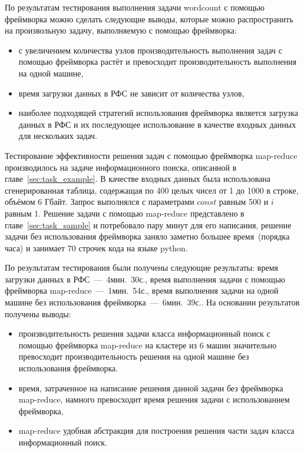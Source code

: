 \documentclass[12pt,a4paper,oneside]{extarticle}
\begin{document}
    По результатам тестирования выполнения задачи wordcount с помощью фреймворка можно сделать следующие выводы, которые можно распространить на произвольную задачу, выполняемую с помощью фреймворка:
    \begin{itemize}
        \item с увеличением количества узлов производительность выполнения задач с помощью фреймворка растёт и превосходит производительность выполнения на одной машине,
        \item время загрузки данных в РФС не зависит от количества узлов,
        \item наиболее подходящей стратегий использования фреймворка является загрузка данных в РФС и их последующее использование в качестве входных данных для нескольких задач.
    \end{itemize}
    
    Тестирование эффективности решения задач с помощью фреймворка map-reduce производилось на задаче информационного поиска, описанной в главе~\ref{sec:task_example}. В качестве входных данных была использована сгенерированная таблица, содержащая по 400 целых чисел от 1 до 1000 в строке, объёмом 6 Гбайт. Запрос выполнялся с параметрами $const$ равным 500 и $i$ равным 1. Решение задачи с помощью map-reduce представлено в главе~\ref{sec:task_sample} и потребовало пару минут для его написания, решение задачи без использования фреймворка заняло заметно большее время~(порядка часа) и занимает 70 строчек кода на языке python.

    По результатам тестирования были получены следующие результаты: время загрузки данных в РФС~---~4мин.~30с., время выполнения задачи с помощью фреймворка map-reduce~---~1мин.~54с., время выполнения задачи на одной машине без использования фреймворка~---~6мин.~39с.. На основании результатов получены выводы:
    \begin{itemize}
        \item производительность решения задачи класса информационный поиск с помощью фреймворка map-reduce на кластере из 6 машин значительно превосходит производительность решения на одной машине без использования фреймворка.
        \item время, затраченное на написание решения данной задачи без фреймворка map-reduce, намного превосходит время решения задачи с использованием фреймворка,
        \item map-reduce удобная абстракция для построения решения части задач класса информационный поиск.

    \end{itemize}
\clearpage
\end{document}
